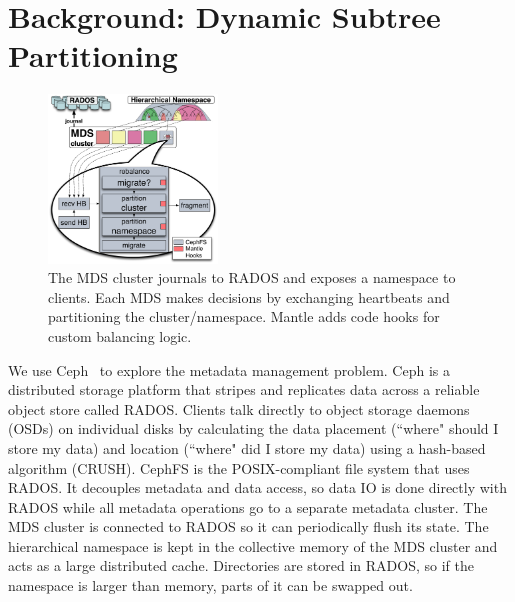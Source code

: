 \section{Background: Dynamic Subtree Partitioning}	%
\label{background_dynamic_subtree_partitioning}			%
\begin{figure}[tb]
	\centering	
	\includegraphics[width=0.4\textwidth]{./chapters/mantle/figures/balancer-diagram.pdf}
 	\caption{The MDS cluster journals to RADOS and exposes a namespace to clients. Each MDS makes decisions by exchanging heartbeats and partitioning the cluster/namespace. Mantle adds code hooks for custom balancing logic.\label{figure:balancer-diagram}}    
\end{figure}   

We use Ceph~\cite{weil:osdi2006-ceph} to explore the metadata management problem. Ceph is a distributed storage platform that stripes and replicates data across a reliable object store called RADOS. Clients talk directly to object storage daemons (OSDs) on individual disks by calculating the data placement (``where" should I store my data) and location (``where" did I store my data) using a hash-based algorithm (CRUSH). CephFS is the POSIX-compliant file system that uses RADOS. It decouples metadata and data access, so data IO is done directly with RADOS while all metadata operations go to a separate metadata cluster. The MDS cluster is connected to RADOS so it can periodically flush its state. The hierarchical namespace is kept in the collective memory of the MDS cluster and acts as a large distributed cache. Directories are stored in RADOS, so if the namespace is larger than memory, parts of it can be swapped out. 

